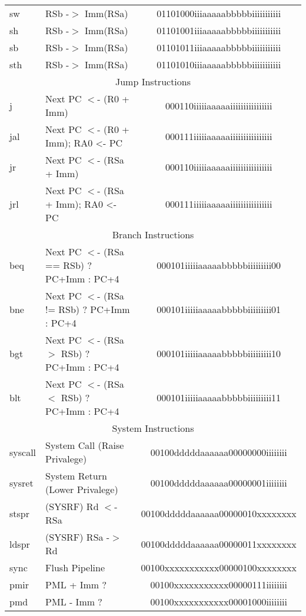 \documentclass[letterpaper, 11pt]{article}
\begin{document}
\begin{center}
\begin{longtable}{|l|l|c|}
			sw			& RSb -$>$ Imm(RSa)								& 01101000iiiaaaaabbbbbiiiiiiiiiii\\
			sh			& RSb -$>$ Imm(RSa)								& 01101001iiiaaaaabbbbbiiiiiiiiiii\\
			sb			& RSb -$>$ Imm(RSa)								& 01101011iiiaaaaabbbbbiiiiiiiiiii\\
			sth			& RSb -$>$ Imm(RSa)								& 01101010iiiaaaaabbbbbiiiiiiiiiii\\
			\hline
			\multicolumn{3}{|c|}{Jump Instructions} \\ \hline		
			j			& Next PC $<$- (R0 + Imm)						& 000110iiiiiaaaaaiiiiiiiiiiiiiiii\\
			jal			& Next PC $<$- (R0 + Imm); RA0 <- PC 			& 000111iiiiiaaaaaiiiiiiiiiiiiiiii\\
			jr			& Next PC $<$- (RSa + Imm)						& 000110iiiiiaaaaaiiiiiiiiiiiiiiii\\
			jrl			& Next PC $<$- (RSa + Imm); RA0 <- PC			& 000111iiiiiaaaaaiiiiiiiiiiiiiiii\\
			\hline
			\multicolumn{3}{|c|}{Branch Instructions} \\ \hline
			beq			& Next PC $<$- (RSa == RSb) ? PC+Imm : PC+4		& 000101iiiiiaaaaabbbbbiiiiiiiii00\\
			bne			& Next PC $<$- (RSa != RSb) ? PC+Imm : PC+4		& 000101iiiiiaaaaabbbbbiiiiiiiii01\\
			bgt			& Next PC $<$- (RSa $>$ RSb) ? PC+Imm : PC+4	& 000101iiiiiaaaaabbbbbiiiiiiiii10\\
			blt			& Next PC $<$- (RSa $<$ RSb) ? PC+Imm : PC+4	& 000101iiiiiaaaaabbbbbiiiiiiiii11\\
			\hline
			\multicolumn{3}{|c|}{System Instructions} \\ \hline
			syscall		& System Call (Raise Privalege)					& 00100dddddaaaaaa00000000iiiiiiii\\
			sysret		& System Return (Lower Privalege)				& 00100dddddaaaaaa00000001iiiiiiii\\
			stspr		& (SYSRF) Rd $<$- RSa							& 00100dddddaaaaaa00000010xxxxxxxx\\
			ldspr		& (SYSRF) RSa -$>$ Rd							& 00100dddddaaaaaa00000011xxxxxxxx\\
			sync		& Flush Pipeline								& 00100xxxxxxxxxxx00000100xxxxxxxx\\
			pmir		& PML + Imm ?									& 00100xxxxxxxxxxx00000111iiiiiiii\\
			pmd			& PML - Imm ?									& 00100xxxxxxxxxxx00001000iiiiiiii\\
			\hline
		\end{longtable}
	\end{center}
\end{document}
